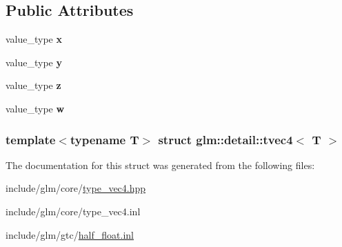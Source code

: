 \subsection*{\-Public \-Attributes}
\begin{DoxyCompactItemize}
\item 
\hypertarget{structglm_1_1detail_1_1tvec4_ac96d73b115aec6f701b54cd602beb61f}{value\-\_\-type {\bfseries x}}\label{structglm_1_1detail_1_1tvec4_ac96d73b115aec6f701b54cd602beb61f}

\item 
\hypertarget{structglm_1_1detail_1_1tvec4_a505c36f3d9beec3fd7ca445edeab8c68}{value\-\_\-type {\bfseries y}}\label{structglm_1_1detail_1_1tvec4_a505c36f3d9beec3fd7ca445edeab8c68}

\item 
\hypertarget{structglm_1_1detail_1_1tvec4_a63b99f92f63bef7b4f555c596f547ba9}{value\-\_\-type {\bfseries z}}\label{structglm_1_1detail_1_1tvec4_a63b99f92f63bef7b4f555c596f547ba9}

\item 
\hypertarget{structglm_1_1detail_1_1tvec4_a0759575c2d612ffbf91e6e07d484a09d}{value\-\_\-type {\bfseries w}}\label{structglm_1_1detail_1_1tvec4_a0759575c2d612ffbf91e6e07d484a09d}

\end{DoxyCompactItemize}
\subsubsection*{template$<$typename \-T$>$ struct glm\-::detail\-::tvec4$<$ T $>$}



\-The documentation for this struct was generated from the following files\-:\begin{DoxyCompactItemize}
\item 
include/glm/core/\hyperlink{type__vec4_8hpp}{type\-\_\-vec4.\-hpp}\item 
include/glm/core/type\-\_\-vec4.\-inl\item 
include/glm/gtc/\hyperlink{half__float_8inl}{half\-\_\-float.\-inl}\end{DoxyCompactItemize}
